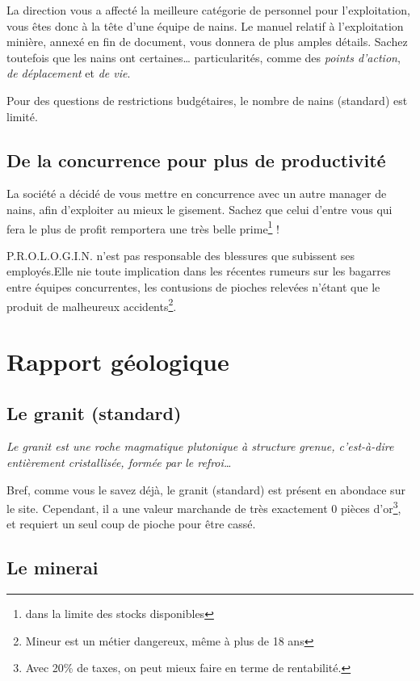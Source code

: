   La direction vous a affecté la meilleure catégorie de personnel pour
  l'exploitation, vous êtes donc à la tête d'une équipe de nains. Le manuel
  relatif à l'exploitation minière, annexé en fin de document, vous donnera de
  plus amples détails. Sachez toutefois que les nains ont certaines\ldots{}
  particularités, comme des \textit{points d'action}, \textit{de déplacement}
  et \textit{de vie}.

  Pour des questions de restrictions budgétaires, le nombre de nains
  (standard) est limité.

\subsection{De la concurrence pour plus de productivité}

  La société a décidé de vous mettre en concurrence avec un autre manager de
  nains, afin d'exploiter au mieux le gisement. Sachez que celui d'entre vous
  qui fera le plus de profit remportera une très belle prime\footnote{dans la
  limite des stocks disponibles} !

  P.R.O.L.O.G.I.N. n'est pas responsable des blessures que subissent ses 
  employés.Elle nie toute implication dans les récentes rumeurs sur les 
  bagarres entre équipes concurrentes, les contusions de pioches relevées 
  n'étant que le produit de malheureux accidents\footnote{Mineur est un 
  métier dangereux, même à plus de 18 ans}.

\newpage

\section{Rapport géologique}

\subsection{Le granit (standard)}

  \textit{Le granit est une roche magmatique plutonique à structure grenue,
  c'est-à-dire entièrement cristallisée, formée par le refroi\ldots{}}

  Bref, comme vous le savez déjà, le granit (standard) est présent en abondace
  sur le site. Cependant, il a une valeur marchande de très exactement 0 pièces
  d'or\footnote{Avec 20\% de taxes, on peut mieux faire en terme de
  rentabilité.}, et requiert un seul coup de pioche pour être cassé.

\subsection{Le minerai}

